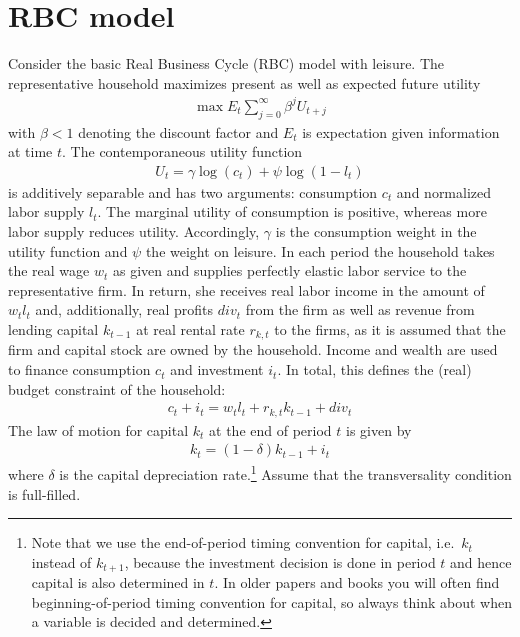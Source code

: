 \section[RBC model]{RBC model\label{ex:RBCModel}}
Consider the basic Real Business Cycle (RBC) model with leisure.
The representative household maximizes present as well as expected future utility
\begin{align*}
\max E_t \sum_{j=0}^{\infty} \beta^{j} U_{t+j}
\end{align*}
with \(\beta <1\) denoting the discount factor and \(E_t\) is expectation given information at time \(t\).
The contemporaneous utility function 
\begin{align*}
U_t = \gamma \log(c_t) + \psi \log{(1-l_{t})}
\end{align*}
  is additively separable and has two arguments: consumption \(c_t\) and normalized labor supply \(l_{t}\).
The marginal utility of consumption is positive, whereas more labor supply reduces utility.
Accordingly, \(\gamma \) is the consumption weight in the utility function and \(\psi \) the weight on leisure.
In each period the household takes the real wage \(w_t\) as given and supplies perfectly elastic labor service to the representative firm.
In return, she receives real labor income in the amount of \(w_t l_{t}\) and, additionally,
  real profits \({div}_t\) from the firm as well as revenue from lending capital \(k_{t-1}\) at real rental rate \(r_{k,t}\) to the firms,
  as it is assumed that the firm and capital stock are owned by the household.
Income and wealth are used to finance consumption \(c_t\) and investment \(i_t\).
In total, this defines the (real) budget constraint of the household:
\begin{align*}
c_t + i_t = w_t l_{t} + r_{k,t} k_{t-1} + {div}_t
\end{align*}
The law of motion for capital \(k_t\) at the end of period \(t\) is given by
\begin{align*}
k_{t} = (1-\delta) k_{t-1} + i_t
\end{align*}
where \(\delta \) is the capital depreciation rate.\footnote{%
  Note that we use the end-of-period timing convention for capital, i.e.\
    \(k_t\) instead of \(k_{t+1}\),
    because the investment decision is done in period \(t\) and hence capital is also determined in \(t\).
  In older papers and books you will often find beginning-of-period timing convention for capital,
    so always think about when a variable is decided and determined.}
Assume that the transversality condition is full-filled.

